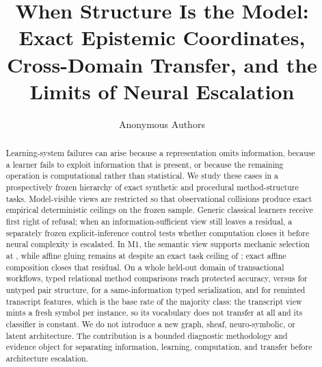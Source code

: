 \documentclass[10pt]{article}
\title{When Structure Is the Model: Exact Epistemic Coordinates, Cross-Domain Transfer, and the Limits of Neural Escalation}
\author{Anonymous Authors}
\begin{document}
\maketitle
{}

\begin{abstract}
Learning-system failures can arise because a representation omits information, because a learner fails to exploit information that is present, or because the remaining operation is computational rather than statistical. We study these cases in a prospectively frozen hierarchy of exact synthetic and procedural method-structure tasks. Model-visible views are restricted so that observational collisions produce exact empirical deterministic ceilings on the frozen sample. Generic classical learners receive first right of refusal; when an information-sufficient view still leaves a residual, a separately frozen explicit-inference control tests whether computation closes it before neural complexity is escalated. In M1, the semantic view supports mechanic selection at \MOneSemanticMechanicAccuracy, while affine gluing remains at \MOneSemanticGluingAccuracy despite an exact task ceiling of \MOneSemanticGluingCeiling; exact affine composition closes that residual. On a whole held-out domain of transactional workflows, typed relational method comparisons reach \DOneTypedAccuracy protected accuracy, versus \DOneUntypedAccuracy for untyped pair structure, \DOneSerializedAccuracy for a same-information typed serialization, and \DOneTranscriptAccuracy for reminted transcript features, which is the base rate of the majority class: the transcript view mints a fresh symbol per instance, so its vocabulary does not transfer at all and its classifier is constant. We do not introduce a new graph, sheaf, neuro-symbolic, or latent architecture. The contribution is a bounded diagnostic methodology and evidence object for separating information, learning, computation, and transfer before architecture escalation.
\end{abstract}












\end{document}
